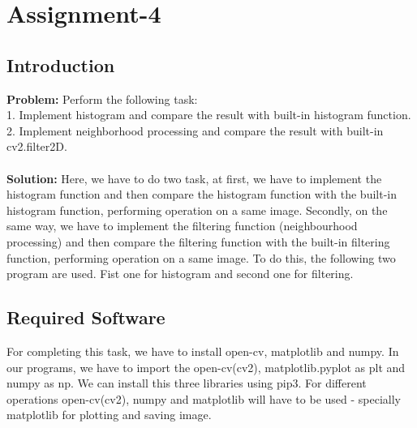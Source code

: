 \documentclass{article}
\begin{document}
{
    \section{Assignment-4}
    \subsection{Introduction}
    \textbf {Problem: }
    Perform the following task:\\
    1. Implement histogram and compare the result with built-in histogram function.\\
    2. Implement neighborhood processing and compare the result with built-in cv2.filter2D.\\
    \\
    \textbf{Solution: }
    Here, we have to do two task, at first, we have to implement the histogram function and then compare the histogram function with the built-in histogram function, performing operation on a same image. Secondly, on the same way, we have to implement the filtering function (neighbourhood processing) and then compare the filtering function with the built-in filtering function, performing operation on a same image. To do this, the following two program are used. Fist one for histogram and second one for filtering.
    \\
    
    \subsection{Required Software}
    For completing this task, we have to install open-cv, matplotlib and numpy. In our programs, we have to import the open-cv(cv2), matplotlib.pyplot as plt and numpy as np. We can install this three libraries using pip3. For different operations open-cv(cv2), numpy and matplotlib will have to be used - specially matplotlib for plotting and saving image. 
    \\
    
}
\end{document}
